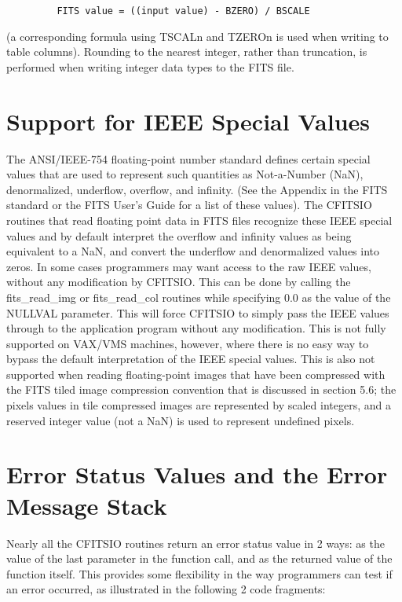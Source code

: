 \documentclass[11pt]{book}
\begin{document}
\begin{verbatim}
         FITS value = ((input value) - BZERO) / BSCALE
\end{verbatim}
(a corresponding formula using TSCALn and TZEROn is used when
writing to table columns).  Rounding to the nearest integer, rather
than truncation, is performed when writing integer data types to the
FITS file.


\section{Support for IEEE Special Values}

The ANSI/IEEE-754 floating-point number standard defines certain
special values that are used to represent such quantities as
Not-a-Number (NaN), denormalized, underflow, overflow, and infinity.
(See the Appendix in the FITS standard or the FITS User's
Guide for a list of these values).  The CFITSIO routines that read
floating point data in FITS files recognize these IEEE special values
and by default interpret the overflow and infinity values as being
equivalent to a NaN, and convert the underflow and denormalized values
into zeros.  In some cases programmers may want access to the raw IEEE
values, without any modification by CFITSIO.  This can be done by
calling the fits\_read\_img or fits\_read\_col routines while
specifying 0.0 as the value of the NULLVAL parameter.  This will force
CFITSIO to simply pass the IEEE values through to the application
program without any modification.  This is not fully supported on
VAX/VMS machines, however, where there is no easy way to bypass the
default interpretation of the IEEE special values.  This is also not
supported when reading floating-point images that have been compressed
with the FITS tiled image compression convention that is discussed in
section 5.6;  the pixels values in tile compressed images are
represented by scaled integers, and a reserved integer value
(not a NaN) is used to represent undefined pixels.


\section{Error Status Values and the Error Message Stack}

Nearly all the CFITSIO routines return an error status value
in 2 ways: as the value of the last parameter in the function call,
and as the returned value of the function itself.  This provides
some flexibility in the way programmers can test if an error
occurred, as illustrated in the following 2 code fragments:
\end{document}
